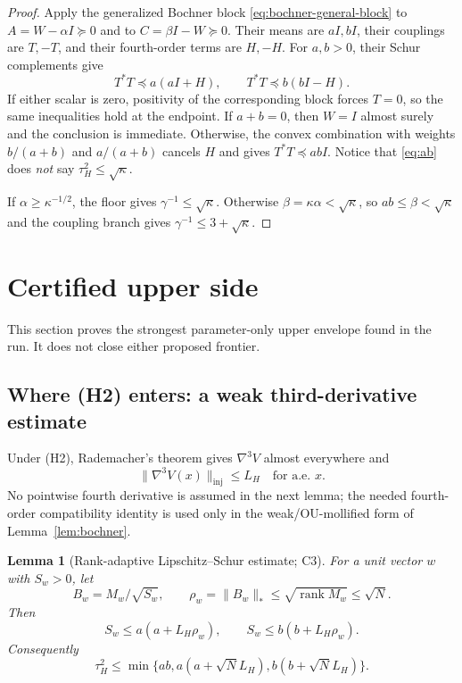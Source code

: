 \documentclass[11pt]{article}
\numberwithin{equation}{section}
\newtheorem{lemma}[theorem]{Lemma}
\newcommand{\inj}{\mathrm{inj}}
\begin{document}
\begin{proof}
Apply the generalized Bochner block \eqref{eq:bochner-general-block} to
$A=W-\alpha I\succeq0$ and to
$C=\beta I-W\succeq0$.  Their means are $aI,bI$, their couplings are
$T,-T$, and their fourth-order terms are $H,-H$.  For $a,b>0$, their Schur
complements give
\[
 T^*T\preceq a(aI+H),\qquad
 T^*T\preceq b(bI-H).
\]
If either scalar is zero, positivity of the corresponding block forces
$T=0$, so the same inequalities hold at the endpoint.
If $a+b=0$, then $W=I$ almost surely and the conclusion is immediate.
Otherwise, the convex combination with weights $b/(a+b)$ and $a/(a+b)$
cancels $H$ and gives $T^*T\preceq abI$.  Notice that \eqref{eq:ab} does
\emph{not} say $\tau_H^2\le\sqrt\kappa$.

If $\alpha\ge\kappa^{-1/2}$, the floor gives
$\gamma^{-1}\le\sqrt\kappa$.  Otherwise
$\beta=\kappa\alpha<\sqrt\kappa$, so
$ab\le\beta<\sqrt\kappa$ and the coupling branch gives
$\gamma^{-1}\le3+\sqrt\kappa$.
\end{proof}

\section{Certified upper side}\label{sec:upper}

This section proves the strongest parameter-only upper envelope found in the
run.  It does not close either proposed frontier.

\subsection{Where (H2) enters: a weak third-derivative estimate}

Under (H2), Rademacher's theorem gives $\nabla^3V$ almost everywhere and
\begin{equation}\label{eq:D3-inj}
 \|\nabla^3V(x)\|_{\inj}\le L_H
 \quad\text{for a.e. }x.
\end{equation}
No pointwise fourth derivative is assumed in the next lemma; the needed
fourth-order compatibility identity is used only in the weak/OU-mollified
form of Lemma~\ref{lem:bochner}.

\begin{lemma}[Rank-adaptive Lipschitz--Schur estimate; C3]
\label{lem:rank-adaptive}
For a unit vector $w$ with $S_w>0$, let
\[
 B_w=M_w/\sqrt{S_w},\qquad
 \rho_w=\|B_w\|_*\le\sqrt{\operatorname{rank}M_w}\le\sqrt N.
\]
Then
\begin{equation}\label{eq:rank-adaptive}
 S_w\le a(a+L_H\rho_w),\qquad
 S_w\le b(b+L_H\rho_w).
\end{equation}
Consequently
\begin{equation}\label{eq:tau-H2-basic}
 \tau_H^2\le
 \min\{ab,a(a+\sqrt N L_H),b(b+\sqrt N L_H)\}.
\end{equation}
\end{lemma}
\end{document}
